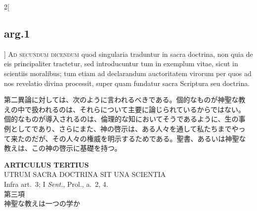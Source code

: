 \documentclass[
paper=a4paper,
fontsize=10pt,
jafontsize=9pt,
titlepage
]{jlreq}
\begin{document}
\begin{paracol}{2}[\subsection{arg.1}]
{\scshape Ad secundum dicendum} quod singularia traduntur in sacra
doctrina, non quia de eis principaliter tractetur, sed introducuntur
tum in exemplum vitae, sicut in scientiis moralibus; tum etiam ad
declarandum auctoritatem virorum per quos ad nos revelatio divina
processit, super quam fundatur sacra Scriptura seu doctrina.

\switchcolumn

第二異論に対しては、次のように言われるべきである。個的なものが神聖な教
えの中で扱われるのは、それらについて主要に論じられているからではない。
個的なものが導入されるのは、倫理的な知においてそうであるように、生の事
例としてであり、さらにまた、神の啓示は、ある人々を通して私たちまでやっ
て来たのだが、その人々の権威を明示するためである。聖書、あるいは神聖な
教えは、この神の啓示に基礎を持つ。

\end{paracol}
\newpage

{}
\setcounter{section}{3}
\setcounter{subsection}{0}
\begin{center}
 {\Large {\bfseries ARTICULUS TERTIUS}}\\
 {\large UTRUM SACRA DOCTRINA SIT UNA SCIENTIA}\\
 {\footnotesize Infra art.~3; I {\itshape Sent.}, Prol., a.~2, 4.}\\
 {\Large 第三項\\神聖な教えは一つの学か}
\end{center}
\end{document}
